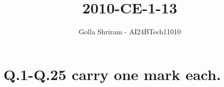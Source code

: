 \documentclass[journal,12pt,twocolumn]{IEEEtran}
\theoremstyle{remark}
\begin{document}
\onecolumn


\vspace{3cm}
\title{ 2010-CE-1-13 }
\author{Golla Shriram - AI24BTech11010}

\maketitle

\renewcommand{\thefigure}{\theenumi}
\renewcommand{\thetable}{\theenumi}

\section{ Q.1-Q.25 carry one mark each. }
                                                                           
\end{document}

